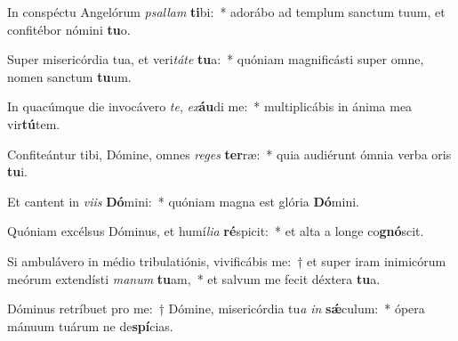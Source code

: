 \item In conspéctu Angelórum \textit{psal}\textit{lam} \textbf{ti}bi:~* adorábo ad templum sanctum tuum, et confitébor nómini \textbf{tu}o.
\item Super misericórdia tua, et veri\textit{tá}\textit{te} \textbf{tu}a:~* quóniam magnificásti super omne, nomen sanctum \textbf{tu}um.
\item In quacúmque die invocávero \textit{te}, \textit{ex}\textbf{áu}di me:~* multiplicábis in ánima mea vir\textbf{tú}tem.
\item Confiteántur tibi, Dómine, omnes \textit{re}\textit{ges} \textbf{ter}ræ:~* quia audiérunt ómnia verba oris \textbf{tu}i.
\item Et cantent in \textit{vi}\textit{is} \textbf{Dó}mini:~* quóniam magna est glória \textbf{Dó}mini.
\item Quóniam excélsus Dóminus, et humí\textit{li}\textit{a} \textbf{ré}spicit:~* et alta a longe co\textbf{gnó}scit.
\item Si ambulávero in médio tribulatiónis, vivificábis me:~† et super iram inimicórum meórum extendísti \textit{ma}\textit{num} \textbf{tu}am,~* et salvum me fecit déxtera \textbf{tu}a.
\item Dóminus retríbuet pro me:~† Dómine, misericórdia tu\textit{a} \textit{in} \textbf{sǽ}culum:~* ópera mánuum tuárum ne de\textbf{spí}cias.
